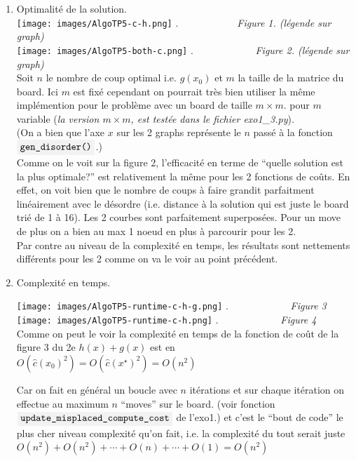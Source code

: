 \documentclass[french]{article}
\newcommand{\code}[1]{$\mbox{\colorbox{light-gray}{\texttt{#1}}}$}
\newcommand{\quo}[1]{``{#1}''}
\newcommand{\xsol}{x^{\star}}
\begin{document}
\begin{enumerate}
\item Optimalité de la solution. \\
\texttt{[image: images/AlgoTP5-c-h.png]}
$.\qquad \qquad \qquad $\textit{Figure 1. (légende sur graph)}\\
\texttt{[image: images/AlgoTP5-both-c.png]}
$.\qquad \qquad \qquad $ \textit{Figure 2. (légende sur graph)}\\

Soit $n$ le nombre de coup optimal i.e. $g(x_0)$ et $m$ la taille de la matrice du board. Ici $m$ est fixé cependant on pourrait très bien utiliser la même implémention pour le problème avec un board de taille $m \times m$. pour $m$ variable (\textit{la version $m \times m$, est testée dans le fichier exo1\_3.py}).\\
(On a bien que l'axe $x$ sur les 2 graphs représente le $n$ passé à la fonction \code{gen\_disorder()}.)\\

Comme on le voit sur la figure 2, l'efficacité en terme de \quo{quelle solution est la plus optimale?} est relativement la même pour les 2 fonctions de coûts. En effet, on voit bien que le nombre de coups à faire grandit parfaitment linéairement avec le désordre (i.e. distance à la solution qui est juste le board trié de 1 à 16). Les 2 courbes sont parfaitement superposées. 
Pour un move de plus on a bien au max 1 noeud en plus à parcourir pour les 2. \\
Par contre au niveau de la complexité en temps, les résultats sont nettements différents pour les 2 comme on va le voir au point précédent.

\item  Complexité en temps.

\texttt{[image: images/AlgoTP5-runtime-c-h-g.png]}
$.\qquad \qquad \qquad $ \textit{Figure 3}\\

\texttt{[image: images/AlgoTP5-runtime-c-h.png]}
$.\qquad \qquad \qquad $ \textit{Figure 4}\\

Comme on peut le voir la complexité en temps de la fonction de coût de la figure 3 du 2e $h(x)+g(x)$ est en $O(\hat{c}(x_0)^2)= O(\hat{c}(\xsol)^2) = O(n^2)$

Car on fait en général un boucle avec $n$ itérations et sur chaque itération on effectue au maximum $n$ \quo{moves} sur le board. (voir fonction \code{update\_misplaced\_compute\_cost} de l'exo1.)
et c'est le \quo{bout de code} le plus cher niveau complexité qu'on fait, i.e. la complexité du tout serait juste $O(n^2)+O(n^2)+ \cdots + O(n)+ \cdots + O(1) = O(n^2)$ \\


\end{enumerate}
\end{document}
